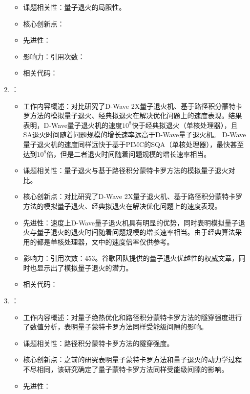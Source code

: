 \begin{enumerate}
\begin{itemize}
                \item 课题相关性：量子退火的局限性。
                \item 核心创新点：
                \item 先进性：
                \item 影响力：引用次数：
                \item 相关代码：
            \end{itemize}
            \item \citet{denchev2016computational}：
            \begin{itemize}
                \item 工作内容概述：对比研究了D-Wave 2X量子退火机、基于路径积分蒙特卡罗方法的模拟量子退火、经典拟退火在解决优化问题上的速度表现。结果表明，D-Wave量子退火机的速度$10^8$快于经典拟退火（单核处理器），且SA退火时间随着问题规模的增长速率远高于D-Wave量子退火机。
                D-Wave量子退火机的速度同样远快于基于PIMC的SQA（单核处理器），最快甚至达到$10^8$倍，但是二者退火时间随着问题规模的增长速率相当。
                \item 课题相关性：量子退火与基于路径积分蒙特卡罗方法的模拟量子退火对比。
                \item 核心创新点：对比研究了D-Wave 2X量子退火机、基于路径积分蒙特卡罗方法的模拟量子退火、经典拟退火在解决优化问题上的速度表现。
                \item 先进性：速度上D-Wave量子退火机具有明显的优势，同时表明模拟量子退火与量子退火的退火时间随着问题规模的增长速率相当。由于经典算法采用的都是单核处理器，文中的速度倍率仅供参考。
                \item 影响力：引用次数：453。谷歌团队提供的量子退火优越性的权威文章，同时也显示出了模拟量子退火的潜力。
                \item 相关代码：
            \end{itemize}
            \item \citet{brady2016quantum}：
            \begin{itemize}
                \item 工作内容概述：对量子绝热优化和路径积分蒙特卡罗方法的隧穿强度进行了数值分析，表明量子蒙特卡罗方法同样受能级间隙的影响。
                \item 课题相关性：路径积分蒙特卡罗方法的隧穿强度。
                \item 核心创新点：之前\citet{liu2015quantum}的研究表明量子蒙特卡罗方法和量子退火的动力学过程不尽相同，该研究确定了量子蒙特卡罗方法同样受能级间隙的影响。
                \item 先进性：

\end{itemize}
\end{enumerate}
